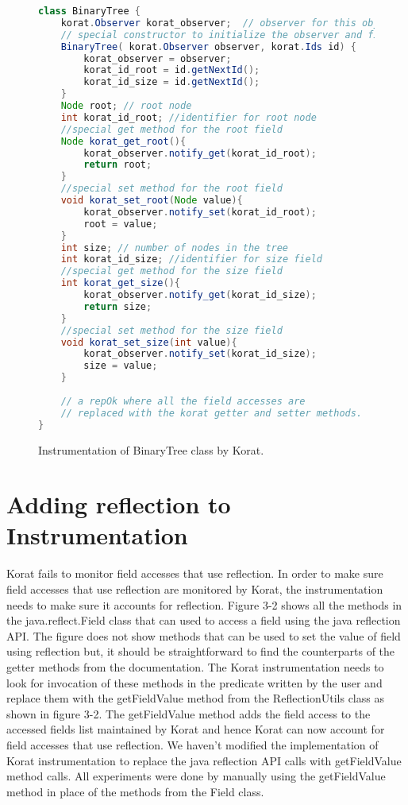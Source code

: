 \begin{figure}
\centering
\begin{lstlisting}[language=Java]
class BinaryTree {
    korat.Observer korat_observer;  // observer for this object
    // special constructor to initialize the observer and field ids
    BinaryTree( korat.Observer observer, korat.Ids id) {
        korat_observer = observer;
        korat_id_root = id.getNextId();
        korat_id_size = id.getNextId();
    }
    Node root; // root node
    int korat_id_root; //identifier for root node
    //special get method for the root field
    Node korat_get_root(){
        korat_observer.notify_get(korat_id_root);
        return root;
    }
    //special set method for the root field
    void korat_set_root(Node value){
        korat_observer.notify_set(korat_id_root);
        root = value;
    }
    int size; // number of nodes in the tree
    int korat_id_size; //identifier for size field
    //special get method for the size field
    int korat_get_size(){ 
        korat_observer.notify_get(korat_id_size);
        return size;
    }
    //special set method for the size field
    void korat_set_size(int value){ 
        korat_observer.notify_set(korat_id_size);
        size = value;
    }
   
    // a repOk where all the field accesses are 
    // replaced with the korat getter and setter methods.
}
\end{lstlisting}
\caption{Instrumentation of BinaryTree class by Korat.}
\label{fig:btTreeInstrumentationKorat}
\end{figure}


\section{Adding reflection to Instrumentation}
Korat fails to monitor field accesses that use reflection. In order to make sure field accesses that use reflection are monitored by Korat, the instrumentation needs to make sure it accounts for reflection. Figure 3-2 shows all the methods in the java.reflect.Field class that can used to access a field using the java reflection API. The figure does not show methods that can be used to set the value of field using reflection but, it should be straightforward to find the counterparts of the getter methods from the documentation. The Korat instrumentation needs to look for invocation of these methods in the predicate written by the user and replace them with the getFieldValue method from the ReflectionUtils class as shown in figure 3-2. The getFieldValue method adds the field access to the accessed fields list maintained by Korat and hence Korat can now account for field accesses that use reflection. We haven’t modified the implementation of Korat instrumentation to replace the java reflection API calls with getFieldValue method calls. All experiments were done by manually using the getFieldValue method in place of the methods from the Field class.

